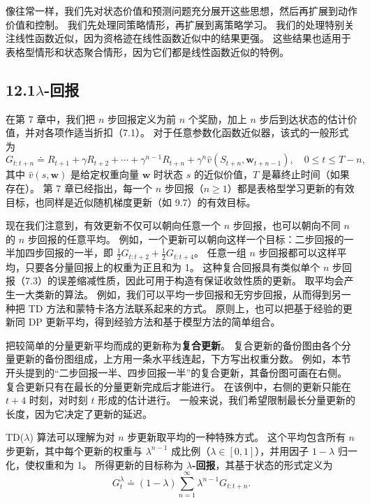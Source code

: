 \documentclass[UTF8,12pt,a4paper,fontset=fandol]{ctexart}
\begin{document}
像往常一样，我们先对状态价值和预测问题充分展开这些思想，然后再扩展到动作价值和控制。
我们先处理同策略情形，再扩展到离策略学习。
我们的处理特别关注线性函数近似，因为资格迹在线性函数近似中的结果更强。
这些结果也适用于表格型情形和状态聚合情形，因为它们都是线性函数近似的特例。

\subsection*{12.1\quad $\lambda$-回报}

在第 7 章中，我们把 $n$ 步回报定义为前 $n$ 个奖励，加上 $n$ 步后到达状态的估计价值，并对各项作适当折扣（7.1）。
对于任意参数化函数近似器，该式的一般形式为
\begin{equation}
G_{t:t+n}\doteq R_{t+1}+\gamma R_{t+2}+\cdots+\gamma^{n-1}R_{t+n}
+\gamma^n\hat v(S_{t+n},\mathbf{w}_{t+n-1}),\quad 0\le t\le T-n,
\tag{12.1}
\end{equation}
其中 $\hat v(s,\mathbf{w})$ 是给定权重向量 $\mathbf{w}$ 时状态 $s$ 的近似价值，$T$ 是幕终止时间（如果存在）。
第 7 章已经指出，每一个 $n$ 步回报（$n\ge 1$）都是表格型学习更新的有效目标，也同样是近似随机梯度更新（如 9.7）的有效目标。

现在我们注意到，有效更新不仅可以朝向任意一个 $n$ 步回报，也可以朝向不同 $n$ 的 $n$ 步回报的任意平均。
例如，一个更新可以朝向这样一个目标：二步回报的一半加四步回报的一半，即 $\frac12G_{t:t+2}+\frac12G_{t:t+4}$。
任意一组 $n$ 步回报都可以这样平均，只要各分量回报上的权重为正且和为 1。
这种复合回报具有类似单个 $n$ 步回报（7.3）的误差缩减性质，因此可用于构造有保证收敛性质的更新。
取平均会产生一大类新的算法。
例如，我们可以平均一步回报和无穷步回报，从而得到另一种把 TD 方法和蒙特卡洛方法联系起来的方式。
原则上，也可以把基于经验的更新同 DP 更新平均，得到经验方法和基于模型方法的简单组合。

把较简单的分量更新平均而成的更新称为\textbf{复合更新}。
复合更新的备份图由各个分量更新的备份图组成，上方用一条水平线连起，下方写出权重分数。
例如，本节开头提到的“二步回报一半、四步回报一半”的复合更新，其备份图可画在右侧。
复合更新只有在最长的分量更新完成后才能进行。
在该例中，右侧的更新只能在 $t+4$ 时刻，对时刻 $t$ 形成的估计进行。
一般来说，我们希望限制最长分量更新的长度，因为它决定了更新的延迟。

TD($\lambda$) 算法可以理解为对 $n$ 步更新取平均的一种特殊方式。
这个平均包含所有 $n$ 步更新，其中每个更新的权重与 $\lambda^{n-1}$ 成比例（$\lambda\in[0,1]$），并用因子 $1-\lambda$ 归一化，使权重和为 1。
所得更新的目标称为 \textbf{$\lambda$-回报}，其基于状态的形式定义为
\begin{equation}
G_t^\lambda\doteq (1-\lambda)\sum_{n=1}^{\infty}\lambda^{n-1}G_{t:t+n}.
\tag{12.2}
\end{equation}
\end{document}
